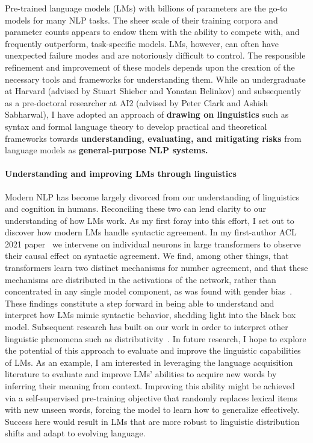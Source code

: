 \documentclass[11pt]{article}
\begin{document}
Pre-trained language models (LMs) with billions of parameters 
are the go-to models for many NLP tasks.
The sheer scale of their training corpora and parameter counts
appears to endow them with the ability to compete with, 
and frequently outperform, task-specific models.
LMs, however, can often have unexpected failure modes 
and are notoriously difficult to control.
The responsible refinement and improvement of these models
depends upon the creation of the necessary tools 
and frameworks for understanding them.
While an undergraduate at Harvard (advised by Stuart Shieber and Yonatan Belinkov) and subsequently as a pre-doctoral researcher 
at AI2 (advised by Peter Clark and Ashish Sabharwal), 
I have adopted an approach of 
\textbf{drawing on linguistics} such as syntax and formal language theory 
to develop practical and theoretical frameworks  
towards \textbf{understanding, evaluating, and mitigating risks} from language models 
as \textbf{general-purpose NLP systems.}

\paragraph{Understanding and improving LMs through linguistics}

Modern NLP has become largely divorced 
from our understanding of linguistics and cognition in humans.
Reconciling these two can lend clarity to our understanding of how LMs work.
As my first foray into this effort, I set out to 
discover how modern LMs handle syntactic agreement.
In my first-author ACL 2021 paper~\cite{finlayson-etal-2021-causal}
we intervene on individual neurons in large transformers 
to observe their causal effect on syntactic agreement.
We find, among other things, that transformers learn 
two distinct mechanisms for number agreement,
and that these mechanisms are distributed in the activations of the network, 
rather than concentrated in any single model component,
as was found with gender bias~\cite{Vig2020InvestigatingGB}.
These findings constitute a step forward in being able to understand and interpret
how LMs mimic syntactic behavior, shedding light into the black box model.
Subsequent research has built on our work 
in order to interpret other linguistic phenomena 
such as distributivity~\cite{Ban2022TestingPL}.
In future research, I hope to explore the potential of this approach
to evaluate and improve the linguistic capabilities of LMs. 
As an example, I am interested in leveraging the language acquisition literature
to evaluate and improve LMs' abilities 
to acquire new words by inferring their meaning from context.
Improving this ability might be achieved via a self-supervised pre-training objective 
that randomly replaces lexical items with new unseen words, 
forcing the model to learn how to generalize effectively.
Success here would result in LMs that are 
more robust to linguistic distribution shifts
and adapt to evolving language.
\end{document}
